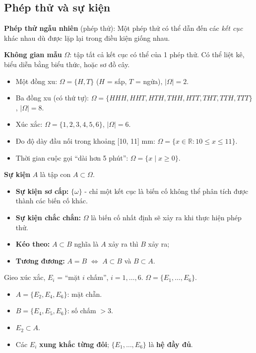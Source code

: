 \documentclass[12pt,a4paper]{article}
\begin{document}
\subsection{Phép thử và sự kiện}

\begin{dinhnghia}[title={Phép thử ngẫu nhiên và không gian mẫu}]
  \textbf{Phép thử ngẫu nhiên} (phép thử): Một phép thử có thể dẫn đến các \emph{kết cục} khác nhau dù được lặp lại trong điều kiện giống nhau.

  \textbf{Không gian mẫu} $\Omega$: tập tất cả kết cục có thể của 1 phép thử. Có thể liệt kê, biểu diễn bằng biểu thức, hoặc sơ đồ cây.
\end{dinhnghia}

\begin{vidu}[title={Không gian mẫu}]
\begin{itemize}
  \item Một đồng xu: $\Omega = \{H, T\}$ ($H$ = sấp, $T$ = ngửa), $|\Omega| = 2$.
  \item Ba đồng xu (có thứ tự): $\Omega = \{HHH, HHT, HTH, THH, HTT, THT, TTH, TTT\}$, $|\Omega| = 8$.
  \item Xúc xắc: $\Omega = \{1,2,3,4,5,6\}$, $|\Omega| = 6$.
  \item Đo độ dày đầu nối trong khoảng [10, 11] mm: $\Omega = \{x \in \mathbb{R} : 10 \le x \le 11\}$.
  \item Thời gian cuộc gọi ``dài hơn 5 phút'': $\Omega = \{x \mid x \ge 0\}$.
\end{itemize}
\end{vidu}

\begin{dinhnghia}[title={Sự kiện (biến cố)}]\textbf{Sự kiện} $A$ là tập con $A \subset \Omega$.
  \begin{itemize}
    \item \textbf{Sự kiện sơ cấp:} $\{\omega\}$ - chỉ một kết cục là biến cố không thể phân tích được thành các biến cố khác.
    \item \textbf{Sự kiện chắc chắn:} $\Omega$ là biến cố nhất định sẽ xảy ra khi thực hiện phép thử.
    \item \textbf{Kéo theo:} $A \subset B$ nghĩa là $A$ xảy ra thì $B$ xảy ra;
    \item \textbf{Tương đương:} $A = B$ $\Leftrightarrow$ $A \subset B$ và $B \subset A$.
  \end{itemize}
\end{dinhnghia}

\begin{vidu}[title={Sự kiện trên xúc xắc}]
Gieo xúc xắc, $E_i$ = ``mặt $i$ chấm'', $i = 1,\ldots, 6$. $\Omega = \{E_1,\ldots,E_6\}$.
\begin{itemize}
  \item $A = \{E_2, E_4, E_6\}$: mặt chẵn.
  \item $B = \{E_4, E_5, E_6\}$: số chấm $> 3$.
  \item $E_2 \subset A$.
  \item Các $E_i$ \textbf{xung khắc từng đôi}; $\{E_1,\ldots,E_6\}$ là \textbf{hệ đầy đủ}.
\end{itemize}
\end{vidu}
\end{document}
